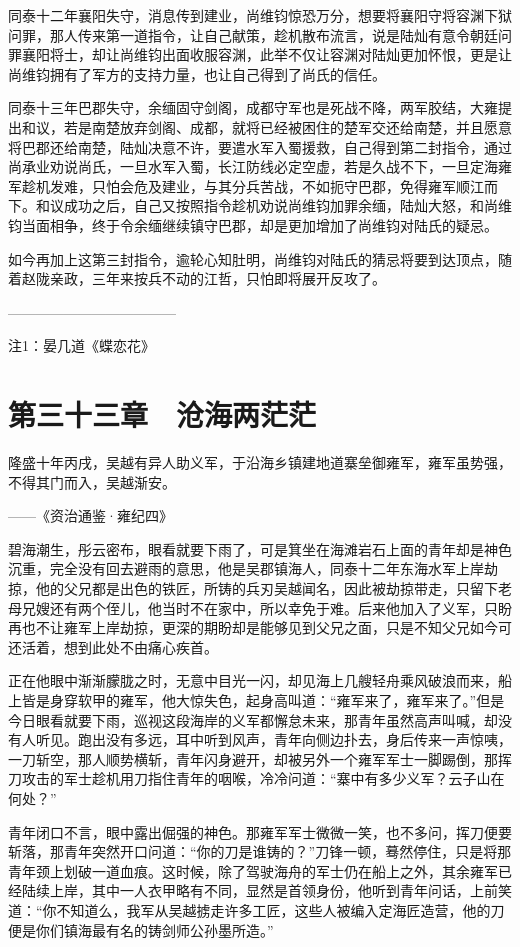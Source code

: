 同泰十二年襄阳失守，消息传到建业，尚维钧惊恐万分，想要将襄阳守将容渊下狱问罪，那人传来第一道指令，让自己献策，趁机散布流言，说是陆灿有意令朝廷问罪襄阳将士，却让尚维钧出面收服容渊，此举不仅让容渊对陆灿更加怀恨，更是让尚维钧拥有了军方的支持力量，也让自己得到了尚氏的信任。

同泰十三年巴郡失守，余缅固守剑阁，成都守军也是死战不降，两军胶结，大雍提出和议，若是南楚放弃剑阁、成都，就将已经被困住的楚军交还给南楚，并且愿意将巴郡还给南楚，陆灿决意不许，要遣水军入蜀援救，自己得到第二封指令，通过尚承业劝说尚氏，一旦水军入蜀，长江防线必定空虚，若是久战不下，一旦定海雍军趁机发难，只怕会危及建业，与其分兵苦战，不如扼守巴郡，免得雍军顺江而下。和议成功之后，自己又按照指令趁机劝说尚维钧加罪余缅，陆灿大怒，和尚维钧当面相争，终于令余缅继续镇守巴郡，却是更加增加了尚维钧对陆氏的疑忌。

如今再加上这第三封指令，逾轮心知肚明，尚维钧对陆氏的猜忌将要到达顶点，随着赵陇亲政，三年来按兵不动的江哲，只怕即将展开反攻了。

————————————

注1：晏几道《蝶恋花》

\chapter{第三十三章　沧海两茫茫}

隆盛十年丙戌，吴越有异人助义军，于沿海乡镇建地道寨垒御雍军，雍军虽势强，不得其门而入，吴越渐安。

——《资治通鉴·雍纪四》

碧海潮生，彤云密布，眼看就要下雨了，可是箕坐在海滩岩石上面的青年却是神色沉重，完全没有回去避雨的意思，他是吴郡镇海人，同泰十二年东海水军上岸劫掠，他的父兄都是出色的铁匠，所铸的兵刃吴越闻名，因此被劫掠带走，只留下老母兄嫂还有两个侄儿，他当时不在家中，所以幸免于难。后来他加入了义军，只盼再也不让雍军上岸劫掠，更深的期盼却是能够见到父兄之面，只是不知父兄如今可还活着，想到此处不由痛心疾首。

正在他眼中渐渐朦胧之时，无意中目光一闪，却见海上几艘轻舟乘风破浪而来，船上皆是身穿软甲的雍军，他大惊失色，起身高叫道：“雍军来了，雍军来了。”但是今日眼看就要下雨，巡视这段海岸的义军都懈怠未来，那青年虽然高声叫喊，却没有人听见。跑出没有多远，耳中听到风声，青年向侧边扑去，身后传来一声惊咦，一刀斩空，那人顺势横斩，青年闪身避开，却被另外一个雍军军士一脚踢倒，那挥刀攻击的军士趁机用刀指住青年的咽喉，冷冷问道：“寨中有多少义军？云子山在何处？”

青年闭口不言，眼中露出倔强的神色。那雍军军士微微一笑，也不多问，挥刀便要斩落，那青年突然开口问道：“你的刀是谁铸的？”刀锋一顿，蓦然停住，只是将那青年颈上划破一道血痕。这时候，除了驾驶海舟的军士仍在船上之外，其余雍军已经陆续上岸，其中一人衣甲略有不同，显然是首领身份，他听到青年问话，上前笑道：“你不知道么，我军从吴越掳走许多工匠，这些人被编入定海匠造营，他的刀便是你们镇海最有名的铸剑师公孙墨所造。”

